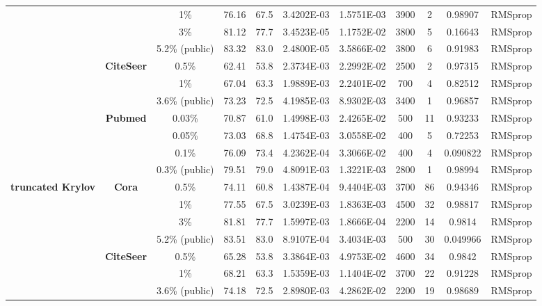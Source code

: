 \begin{table}[htbp]
\begin{tabular}{ccccc|cccccc}
          &       & 1\%   & 76.16 & 67.5  & 3.4202E-03 & 1.5751E-03 & 3900  & 2     & 0.98907 & RMSprop \\
          &       & 3\%   & 81.12 & 77.7  & 3.4523E-05 & 1.1752E-02 & 3800  & 5     & 0.16643 & RMSprop \\
          &       & 5.2\% (public) & 83.32 & 83.0  & 2.4800E-05 & 3.5866E-02 & 3800  & 6     & 0.91983 & RMSprop \\
          & \multirow{3}[0]{*}{\textbf{CiteSeer}} & 0.5\% & 62.41 & 53.8  & 2.3734E-03 & 2.2992E-02 & 2500  & 2     & 0.97315 & RMSprop \\
          &       & 1\%   & 67.04 & 63.3  & 1.9889E-03 & 2.2401E-02 & 700   & 4     & 0.82512 & RMSprop \\
          &       & 3.6\% (public) & 73.23 & 72.5  & 4.1985E-03 & 8.9302E-03 & 3400  & 1     & 0.96857 & RMSprop \\
          & \multirow{4}[1]{*}{\textbf{Pubmed}} & 0.03\% & 70.87 & 61.0  & 1.4998E-03 & 2.4265E-02 & 500   & 11    & 0.93233 & RMSprop \\
          &       & 0.05\% & 73.03 & 68.8  & 1.4754E-03 & 3.0558E-02 & 400   & 5     & 0.72253 & RMSprop \\
          &       & 0.1\% & 76.09 & 73.4  & 4.2362E-04 & 3.3066E-02 & 400   & 4     & 0.090822 & RMSprop \\
          &       & 0.3\% (public) & 79.51 & 79.0  & 4.8091E-03 & 1.3221E-03 & 2800  & 1     & 0.98994 & RMSprop \\
    \midrule
    \multirow{11}[2]{*}{\textbf{truncated Krylov}} & \multirow{4}[1]{*}{\textbf{Cora}} & 0.5\% & 74.11 & 60.8  & 1.4387E-04 & 9.4404E-03 & 3700  & 86    & 0.94346 & RMSprop \\
          &       & 1\%   & 77.55 & 67.5  & 3.0239E-03 & 1.8363E-03 & 4500  & 32    & 0.98817 & RMSprop \\
          &       & 3\%   & 81.81 & 77.7  & 1.5997E-03 & 1.8666E-04 & 2200  & 14    & 0.9814 & RMSprop \\
          &       & 5.2\% (public) & 83.51 & 83.0  & 8.9107E-04 & 3.4034E-03 & 500   & 30    & 0.049966 & RMSprop \\
          & \multirow{3}[0]{*}{\textbf{CiteSeer}} & 0.5\% & 65.28 & 53.8  & 3.3864E-03 & 4.9753E-02 & 4600  & 34    & 0.9842 & RMSprop \\
          &       & 1\%   & 68.21 & 63.3  & 1.5359E-03 & 1.1404E-02 & 3700  & 22    & 0.91228 & RMSprop \\
          &       & 3.6\% (public) & 74.18 & 72.5  & 2.8980E-03 & 4.2862E-02 & 2200  & 19    & 0.98689 & RMSprop \\

\end{tabular}
\end{table}

